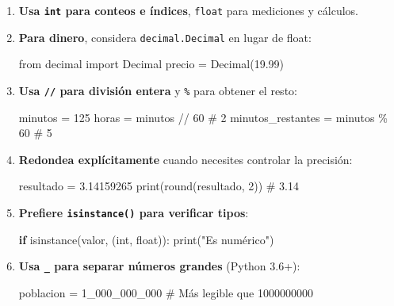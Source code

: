 \documentclass[
  doc,
  floatsintext,
  longtable,
  a4paper,
  nolmodern,
  notxfonts,
  notimes,
  12pt,
  colorlinks=true,linkcolor=blue,citecolor=blue,urlcolor=blue]{apa7}
\newenvironment{Shaded}{\begin{snugshade}}{\end{snugshade}}
\newcommand{\BuiltInTok}[1]{\textcolor[rgb]{0.00,0.23,0.31}{#1}}
\newcommand{\CommentTok}[1]{\textcolor[rgb]{0.37,0.37,0.37}{#1}}
\newcommand{\ControlFlowTok}[1]{\textcolor[rgb]{0.00,0.23,0.31}{\textbf{#1}}}
\newcommand{\DecValTok}[1]{\textcolor[rgb]{0.68,0.00,0.00}{#1}}
\newcommand{\FloatTok}[1]{\textcolor[rgb]{0.68,0.00,0.00}{#1}}
\newcommand{\ImportTok}[1]{\textcolor[rgb]{0.00,0.46,0.62}{#1}}
\newcommand{\NormalTok}[1]{\textcolor[rgb]{0.00,0.23,0.31}{#1}}
\newcommand{\OperatorTok}[1]{\textcolor[rgb]{0.37,0.37,0.37}{#1}}
\newcommand{\StringTok}[1]{\textcolor[rgb]{0.13,0.47,0.30}{#1}}
\begin{document}
\begin{enumerate}
\def\labelenumi{\arabic{enumi}.}
\item
  \textbf{Usa \texttt{int} para conteos e índices}, \texttt{float} para
  mediciones y cálculos.
\item
  \textbf{Para dinero}, considera \texttt{decimal.Decimal} en lugar de
  float:

\begin{Shaded}
\begin{Highlighting}[]
\ImportTok{from}\NormalTok{ decimal }\ImportTok{import}\NormalTok{ Decimal}
\NormalTok{precio }\OperatorTok{=}\NormalTok{ Decimal(}\StringTok{\textquotesingle{}19.99\textquotesingle{}}\NormalTok{)}
\end{Highlighting}
\end{Shaded}
\item
  \textbf{Usa \texttt{//} para división entera} y \texttt{\%} para
  obtener el resto:

\begin{Shaded}
\begin{Highlighting}[]
\NormalTok{minutos }\OperatorTok{=} \DecValTok{125}
\NormalTok{horas }\OperatorTok{=}\NormalTok{ minutos }\OperatorTok{//} \DecValTok{60}   \CommentTok{\# 2}
\NormalTok{minutos\_restantes }\OperatorTok{=}\NormalTok{ minutos }\OperatorTok{\%} \DecValTok{60}  \CommentTok{\# 5}
\end{Highlighting}
\end{Shaded}
\item
  \textbf{Redondea explícitamente} cuando necesites controlar la
  precisión:

\begin{Shaded}
\begin{Highlighting}[]
\NormalTok{resultado }\OperatorTok{=} \FloatTok{3.14159265}
\BuiltInTok{print}\NormalTok{(}\BuiltInTok{round}\NormalTok{(resultado, }\DecValTok{2}\NormalTok{))  }\CommentTok{\# 3.14}
\end{Highlighting}
\end{Shaded}
\item
  \textbf{Prefiere \texttt{isinstance()} para verificar tipos}:

\begin{Shaded}
\begin{Highlighting}[]
\ControlFlowTok{if} \BuiltInTok{isinstance}\NormalTok{(valor, (}\BuiltInTok{int}\NormalTok{, }\BuiltInTok{float}\NormalTok{)):}
    \BuiltInTok{print}\NormalTok{(}\StringTok{"Es numérico"}\NormalTok{)}
\end{Highlighting}
\end{Shaded}
\item
  \textbf{Usa \texttt{\_} para separar números grandes} (Python 3.6+):

\begin{Shaded}
\begin{Highlighting}[]
\NormalTok{poblacion }\OperatorTok{=} \DecValTok{1\_000\_000\_000}  \CommentTok{\# Más legible que 1000000000}
\end{Highlighting}
\end{Shaded}
\end{enumerate}
\end{document}
